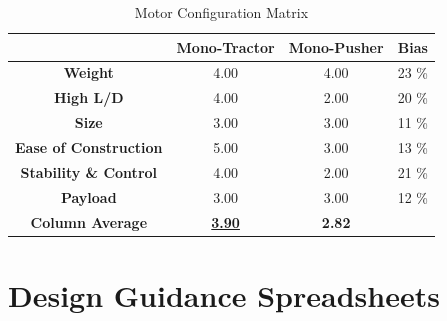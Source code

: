 \documentclass[titlepage]{article}
\begin{document}
\begin{appendices}
\begin{table}[h!]
\caption{Motor Configuration Matrix}
\centering
\begin{tabular}{|c|c|c|c|}
\hline
& \textbf{Mono-Tractor} & \textbf{Mono-Pusher} & \textbf{Bias}\\
\hline
\textbf{Weight} & 4.00 & 4.00 & 23 \%\\
\hline
\textbf{High L/D} & 4.00 & 2.00 & 20 \%\\
\hline
\textbf{Size} & 3.00 & 3.00 & 11 \% \\
\hline
\textbf{Ease of Construction} & 5.00 & 3.00 & 13 \% \\
\hline
\textbf{Stability \& Control} & 4.00 & 2.00 & 21 \% \\
\hline
\textbf{Payload} & 3.00 & 3.00 & 12 \% \\
\hline
\textbf{Column Average} & \textbf{\underline{3.90}} & \textbf{2.82}& \\
\hline
\end{tabular}
\label{tab:motor}
\end{table}
\newpage

\section{Design Guidance Spreadsheets}
\begin{minipage}{\textwidth}

\end{minipage}




\end{appendices}
\end{document}
